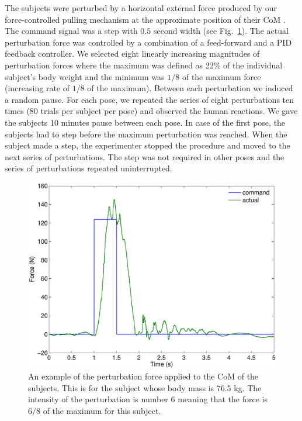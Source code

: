 The subjects were perturbed by a horizontal external force produced by our
force-controlled pulling mechanism \cite{Peternel&Babic13} at the approximate
position of their CoM \cite{Gardetal04}.  The command signal was a step with
$0.5$ second width (see Fig.~\ref{perturbations}).  The actual perturbation
force was controlled by a combination of a feed-forward and a PID feedback
controller.  We selected eight linearly increasing magnitudes of perturbation
forces where the maximum was defined as 22\% of the individual subject's body
weight and the minimum was $1/8$ of the maximum force (increasing rate of
$1/8$ of the maximum).  Between each perturbation we induced a random pause.
For each pose, we repeated the series of eight perturbations ten times (80
trials per subject per pose) and observed the human reactions.  We gave the
subjects 10 minutes pause between each pose.  In case of the first pose, the
subjects had to step before the maximum perturbation was reached.  When the
subject made a step, the experimenter stopped the procedure and moved to the
next series of perturbations.  The step was not required in other poses and
the series of perturbations repeated uninterrupted.
\begin{figure}
  \centering
  \includegraphics[scale=0.4]{Morteza/figs/perturbation.pdf}
  \caption{An example of the perturbation force applied to the CoM of the
    subjects.  This is for the subject whose body mass is $76.5$ kg.  The
    intensity of the perturbation is number $6$ meaning that the force is
    $6/8$ of the maximum for this subject.}
  \label{perturbations}
\end{figure}

